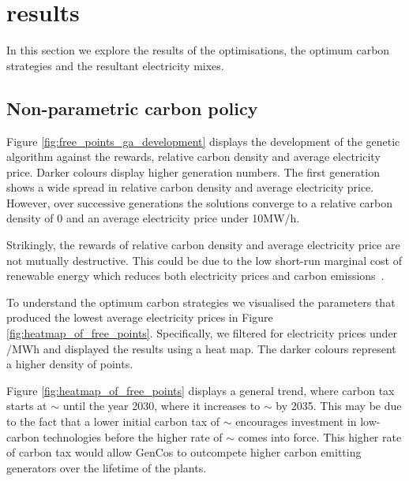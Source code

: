 \documentclass[sigconf]{acmart}
\begin{document}
\section{results}
\label{sec:results}

In this section we explore the results of the optimisations, the optimum carbon strategies and the resultant electricity mixes.

\subsection{Non-parametric carbon policy}
\label{sssec:result_non_parametric_strategy}

Figure \ref{fig:free_points_ga_development} displays the development of the genetic algorithm against the rewards, relative carbon density and average electricity price. Darker colours display higher generation numbers. The first generation shows a wide spread in relative carbon density and average electricity price. However, over successive generations the solutions converge to a relative carbon density of 0 and an average electricity price under \textsterling10MW/h. 

Strikingly, the rewards of relative carbon density and average electricity price are not mutually destructive. This could be due to the low short-run marginal cost of renewable energy which reduces both electricity prices and carbon emissions~\cite{OMahoney2011}.





To understand the optimum carbon strategies we visualised the parameters that produced the lowest average electricity prices in Figure \ref{fig:heatmap_of_free_points}. Specifically, we filtered for electricity prices under /MWh and displayed the results using a heat map. The darker colours represent a higher density of points. 

Figure \ref{fig:heatmap_of_free_points} displays a general trend, where carbon tax starts at ${\sim}$ until the year 2030, where it increases to ${\sim}$ by 2035. This may be due to the fact that a lower initial carbon tax of ${\sim}$ encourages investment in low-carbon technologies  before the higher rate of ${\sim}$ comes into force. This higher rate of carbon tax would allow GenCos to outcompete higher carbon emitting generators over the lifetime of the plants.
\end{document}
